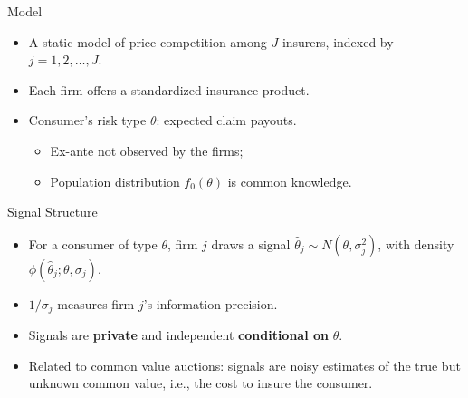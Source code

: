 \documentclass[10pt,aspectratio=169]{beamer}
\begin{document}
\begin{frame}{Model}
    \begin{itemize}
        \item A static model of price competition among $J$ insurers, indexed by $j=1, 2, \dots, J$.
        
        \medskip
        \item Each firm offers a standardized insurance product.
        
        \medskip
        \item Consumer's risk type $\theta$: expected claim payouts.
        \begin{itemize}
            \item Ex-ante not observed by the firms;
            \item Population distribution $f_0(\theta)$ is common knowledge.
        \end{itemize}
    \end{itemize}
\end{frame}

\begin{frame}{Signal Structure}
    \begin{itemize}
        \item For a consumer of type $\theta$, firm $j$ draws a signal $\hat{\theta}_j \sim N(\theta, \sigma_j^2)$, with density $\phi(\hat{\theta}_j; \theta, \sigma_j)$.
        
        \medskip
        \item $1/\sigma_j$ measures firm $j$'s information precision.
        
        \medskip
        \item Signals are \textbf{private} and independent \textbf{conditional on} $\theta$.
        
        \medskip
        \item Related to common value auctions: signals are noisy estimates of the true but unknown common value, i.e., the cost to insure the consumer.
    \end{itemize}
\end{frame}
\end{document}
